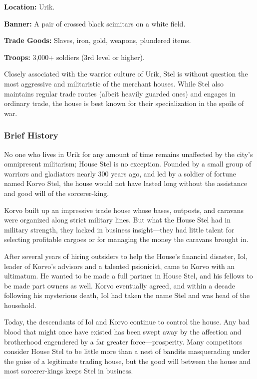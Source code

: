 \textbf{Location:} Urik.

\textbf{Banner:} A pair of crossed black scimitars on a white field.

\textbf{Trade Goods:} Slaves, iron, gold, weapons, plundered items.

\textbf{Troops:} 3,000+ soldiers (3rd level or higher).

Closely associated with the warrior culture of Urik, Stel is without question the most aggressive and militaristic of the merchant houses. While Stel also maintains regular trade routes (albeit heavily guarded ones) and engages in ordinary trade, the house is best known for their specialization in the spoils of war.

\subsubsection{Brief History}
No one who lives in Urik for any amount of time remains unaffected by the city's omnipresent militarism; House Stel is no exception. Founded by a small group of warriors and gladiators nearly 300 years ago, and led by a soldier of fortune named Korvo Stel, the house would not have lasted long without the assistance and good will of the sorcerer-king.

Korvo built up an impressive trade house whose bases, outposts, and caravans were organized along strict military lines. But what the House Stel had in military strength, they lacked in business insight---they had little talent for selecting profitable cargoes or for managing the money the caravans brought in.

After several years of hiring outsiders to help the House's financial disaster, Iol, leader of Korvo's advisors and a talented psionicist, came to Korvo with an ultimatum. He wanted to be made a full partner in House Stel, and his fellows to be made part owners as well. Korvo eventually agreed, and within a decade following his mysterious death, Iol had taken the name Stel and was head of the household.

Today, the descendants of Iol and Korvo continue to control the house. Any bad blood that might once have existed has been swept away by the affection and brotherhood engendered by a far greater force---prosperity. Many competitors consider House Stel to be little more than a nest of bandits masquerading under the guise of a legitimate trading house, but the good will between the house and most sorcerer-kings keeps Stel in business.

